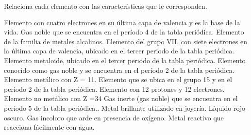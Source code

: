 \question[10] Relaciona cada elemento con las características que le
corresponden.

\begin{minipage}{0.6\textwidth}
    \begin{choices}
        \choice Elemento con cuatro electrones en su última capa de
        valencia y es la base de la vida.
        \choice Gas noble que se encuentra en el período 4 de la tabla
        periódica.
        \choice Elemento de la familia de metales alcalinos.
        \choice Elemento del grupo VII, con siete electrones en la
        última capa
        de valencia, ubicado en el tercer periodo de la tabla
        periódica.
        \choice Elemento metaloide, ubicado en el tercer periodo de la
        tabla
        periódica.
        \choice Elemento conocido como gas noble y se encuentra en el
        período 2 de la tabla periódica.
        \choice Elemento metálico con Z = 11.
        \choice Elemento que se ubica en el grupo 15 y en el periodo 2
        de la
        tabla periódica.
        \choice Elemento con 12 protones y 12 electrones.
        \choice Elemento no metálico con Z =34
        \choice Gas inerte (gas noble) que se encuentra en el período 5
        de la tabla periódica..
        \choice Metal brillante utilizado en joyería.
        \choice Líquido rojo oscuro.
        \choice Gas incoloro que arde en presencia de oxígeno.
        \choice Metal reactivo que reacciona fácilmente con agua.
    \end{choices}
\end{minipage}\hfill
